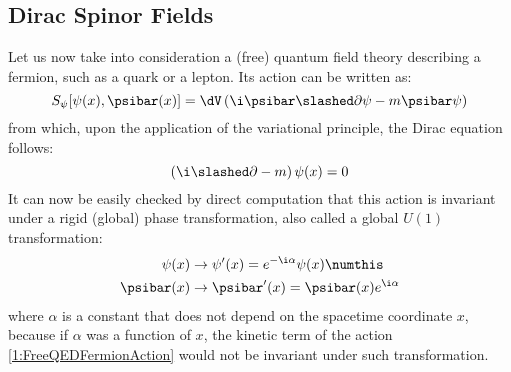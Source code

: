 \subsection{Dirac Spinor Fields}
Let us now take into consideration a (free) quantum field theory describing a fermion, such as a quark or a lepton. Its action can be written as:
\begin{equation}
      S_\psi[\psi(x),\psibar(x)] = \dV \left( \i\psibar\slashed\partial\psi - m\psibar\psi \right) \label{1:FreeQEDFermionAction}
\end{equation}
from which, upon the application of the variational principle, the Dirac equation follows:
\begin{equation}
    \left( \i\slashed\partial-m \right) \psi(x) = 0 \label{1:DiracEq}
\end{equation}
It can now be easily checked by direct computation that this action is invariant under a rigid (global) phase transformation, also called a global $U(1)$ transformation:
\begin{align*}
    \psi(x) &\rightarrow \psi'(x) = e^{-\i\alpha}\psi(x) \numthis\label{1:PhaseTransform} \\
    \psibar(x) &\rightarrow \psibar'(x) = \psibar(x) e^{\i\alpha}
\end{align*}
where $\alpha$ is a constant that does not depend on the spacetime coordinate $x$, because if $\alpha$ was a function of $x$, the kinetic term of the action \eqref{1:FreeQEDFermionAction} would not be invariant under such transformation.

